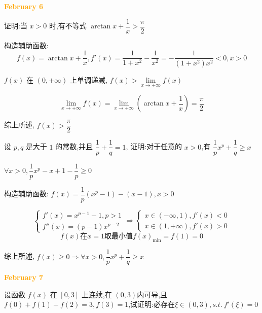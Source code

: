 \textcolor{orange}{\textbf{February 6}}

\begin{example}[][Exam: 28.1.11]
	证明:当 $x>0$ 时,有不等式 $\arctan x+\dfrac{1}{x}>\dfrac{\pi}{2}$
\end{example}
\begin{solution}

	构造辅助函数: 
	$$f(x) = \arctan x +\dfrac{1}{x}, f'(x) = \dfrac{1}{1+x^{2}}-\dfrac{1}{x^{2}} = -\dfrac{1}{(1+x^{2})x^{2}} < 0, x>0$$

	$f(x)$ 在 $(0,+\infty)$ 上单调递减, $f(x) > \lim\limits_{x\to +\infty}f(x)$

	$$\lim\limits_{x\to +\infty}f(x) = \lim\limits_{x\to +\infty}(\arctan x +\dfrac{1}{x}) =\dfrac{\pi}{2}$$

	综上所述, $f(x) > \dfrac{\pi}{2}$
\end{solution}

\begin{example}[][Exam: 28.1.12]
	设 $p,q$ 是大于 $1$ 的常数,并且 $\dfrac{1}{p}+\dfrac{1}{q}=1$,
	证明:对于任意的 $x>0$,有 $\dfrac{1}{p}x^{p}+\dfrac{1}{q}\geq x$
\end{example}

\begin{solution}

	$\forall x > 0, \dfrac{1}{p}x^{p} -x +1-\dfrac{1}{p} \geq 0$
	
	构造辅助函数: $f(x) = \dfrac{1}{p}(x^{p}-1) - (x-1), x > 0$

	$$\begin{cases}
		f'(x) = x^{p-1}-1, p > 1\\
		f''(x) = (p-1)x^{p-2}
	\end{cases}\Rightarrow 
	\begin{cases}
		x\in (-\infty,1), f'(x) < 0\\
		x\in(1,+\infty), f'(x) > 0
	\end{cases}$$
	$$f(x)\text{在} x=1\text{取最小值} f(x)_{\min} = f(1) =0$$

	综上所述, $f(x)\geq 0\Rightarrow \forall x > 0, \dfrac{1}{p}x^{p}+\dfrac{1}{q}\geq x$
\end{solution}

\textcolor{orange}{\textbf{February 7}}

\begin{example}[][Exam: 28.1.13]
	设函数 $f(x)$ 在 $[0,3]$ 上连续,在 $(0,3)$内可导,且 $f(0)+f(1)+f(2)=3,f(3)=1$,试证明:必存在$\xi\in(0,3),s.t.\ f'(\xi)=0$
\end{example}
 
